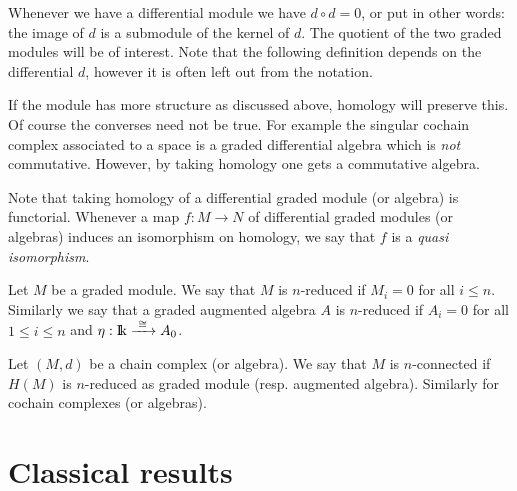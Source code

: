 Whenever we have a differential module we have $d \circ d = 0$, or put in other words: the image of $d$ is a submodule of the kernel of $d$. The quotient of the two graded modules will be of interest. Note that the following definition depends on the differential $d$, however it is often left out from the notation.


If the module has more structure as discussed above, homology will preserve this.
Of course the converses need not be true. For example the singular cochain complex associated to a space is a graded differential algebra which is \emph{not} commutative. However, by taking homology one gets a commutative algebra.

Note that taking homology of a differential graded module (or algebra) is functorial. Whenever a map $f: M \to N$ of differential graded modules (or algebras) induces an isomorphism on homology, we say that $f$ is a \emph{quasi isomorphism}.

\begin{definition}
	Let $M$ be a graded module. We say that $M$ is $n$-reduced if $M_i = 0$ for all $i \leq n$. Similarly we say that a graded augmented algebra $A$ is $n$-reduced if $A_i = 0$ for all $1 \leq i \leq n$ and $\eta: \mathrm{I\!k} \xrightarrow{\,\,{\cong}\,\,} A_0$.

	Let $(M, d)$ be a chain complex (or algebra). We say that $M$ is $n$-connected if $H(M)$ is $n$-reduced as graded module (resp. augmented algebra). Similarly for cochain complexes (or algebras).
\end{definition}


\section{Classical results}

